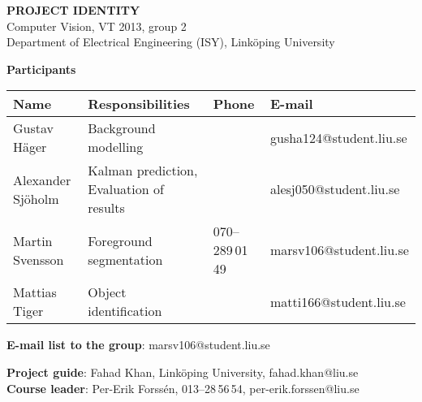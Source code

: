 \begin{center}
    \vspace*{4\baselineskip}

	\textbf{\huge PROJECT IDENTITY} \\
	\vspace*{0.5\baselineskip}
	Computer Vision, VT 2013, group 2 \\
	Department of Electrical Engineering (ISY), Link\"{o}ping University
	
	\vspace*{2\baselineskip}
	\textbf{\LARGE Participants}


	{\footnotesize 
	\begin{tabular}{|p{2.7cm}|p{5cm}|p{2cm}|p{3.4cm}|}
		\hline
			\textbf{Name} & \textbf{Responsibilities} & \textbf{Phone} & \textbf{E-mail} \\
		\hline
		Gustav Häger & Background modelling &  & gusha124@student.liu.se \\
		\hline
		Alexander Sjöholm & Kalman prediction, \newline Evaluation of results &  & alesj050@student.liu.se \\
		\hline
		Martin Svensson & Foreground segmentation & 070--289\,01\,49 & marsv106@student.liu.se \\
		\hline
		Mattias Tiger & Object identification &  & matti166@student.liu.se \\
		\hline
	\end{tabular}
	}

{\footnotesize 
\textbf{E-mail list to the group}: marsv106@student.liu.se \\
\vspace{1\baselineskip}

\textbf{Project guide}: Fahad Khan, Link\"{o}ping University, fahad.khan@liu.se \\
\textbf{Course leader}: Per-Erik Forssén, 013--28\,56\,54, per-erik.forssen@liu.se \\
}

\end{center}
